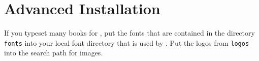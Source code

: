 \section{Advanced Installation}
\label{sec-advanced-latex-installation}

If you typeset many books for \lsp, put the fonts that are contained in the directory \texttt{fonts}
into your local font directory that is used by \xelatex. Put the logos from \texttt{logos} into the
search path for images. 


